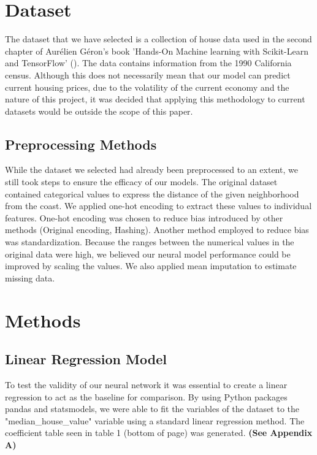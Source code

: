 \documentclass[11pt]{article}
\begin{document}
\section{Dataset}

The dataset that we have selected is a collection of house data used in the second chapter of Aurélien Géron's book 'Hands-On Machine learning with Scikit-Learn and TensorFlow' (\citeyear{Geron2022}). The data contains information from the 1990 California census. Although this does not necessarily mean that our model can predict current housing prices, due to the volatility of the current economy and the nature of this project, it was decided that applying this methodology to current datasets would be outside the scope of this paper.

\subsection{Preprocessing Methods}

While the dataset we selected had already been preprocessed to an extent, we still took steps to ensure the efficacy of our models. The original dataset contained categorical values to express the distance of the given neighborhood from the coast. 
We applied one-hot encoding to extract these values to individual features. One-hot encoding was chosen to reduce bias introduced by other methods (Original encoding, Hashing). Another method employed to reduce bias was standardization. Because the ranges between the numerical values in the original data were high, we believed our neural model performance could be improved by scaling the values. We also applied mean imputation to estimate missing data.


\section{Methods}

\subsection{Linear Regression Model}

To test the validity of our neural network it was essential to create a linear regression to act as the baseline for comparison. By using Python packages pandas and statsmodels, we were able to fit the variables of the dataset to the "median\_house\_value" variable using a standard linear regression method. The coefficient table seen in table 1 (bottom of page) was generated.
\textbf{(See Appendix A)}
\end{document}
